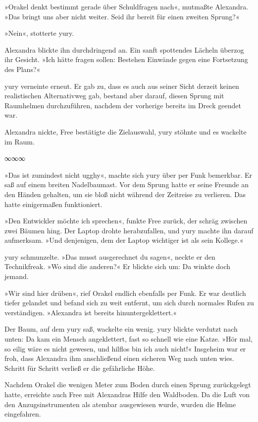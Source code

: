 »Orakel denkt bestimmt gerade über Schuldfragen nach«, mutmaßte Alexandra. »Das bringt uns aber nicht weiter. Seid ihr bereit für einen zweiten Sprung?«

»Nein«, stotterte yury.

Alexandra blickte ihn durchdringend an. Ein sanft spottendes Lächeln überzog ihr Gesicht. »Ich hätte fragen sollen: Bestehen Einwände gegen eine Fortsetzung des Plans?«

yury verneinte erneut. Er gab zu, dass es auch aus seiner Sicht derzeit keinen realistischen Alternativweg gab, bestand aber darauf, diesen Sprung mit Raumhelmen durchzuführen, nachdem der vorherige bereits im Dreck geendet war.

Alexandra nickte, Free bestätigte die Zielauswahl, yury stöhnte und es wackelte im Raum.

\begin{center}
∞∞∞
\end{center}

»Das ist zumindest nicht ugghy«, machte sich yury über per Funk bemerkbar. Er saß auf einem breiten Nadelbaumast. Vor dem Sprung hatte er seine Freunde an den Händen gehalten, um sie bloß nicht während der Zeitreise zu verlieren. Das hatte einigermaßen funktioniert.

»Den Entwickler möchte ich sprechen«, funkte Free zurück, der schräg zwischen zwei Bäumen hing. Der Laptop drohte herabzufallen, und yury machte ihn darauf aufmerksam. »Und denjenigen, dem der Laptop wichtiger ist als sein Kollege.«

yury schmunzelte. »Das musst ausgerechnet du sagen«, neckte er den Technikfreak. »Wo sind die anderen?« Er blickte sich um: Da winkte doch jemand.

»Wir sind hier drüben«, rief Orakel endlich ebenfalls per Funk. Er war deutlich tiefer gelandet und befand sich zu weit entfernt, um sich durch normales Rufen zu verständigen. »Alexandra ist bereits hinuntergeklettert.«

Der Baum, auf dem yury saß, wackelte ein wenig. yury blickte verdutzt nach unten: Da kam ein Mensch angeklettert, fast so schnell wie eine Katze. »Hör mal, so eilig wäre es nicht gewesen, und hilflos bin ich auch nicht!« Insgeheim war er froh, dass Alexandra ihm anschließend einen sicheren Weg nach unten wies. Schritt für Schritt verließ er die gefährliche Höhe.

Nachdem Orakel die wenigen Meter zum Boden durch einen Sprung zurückgelegt hatte, erreichte auch Free mit Alexandras Hilfe den Waldboden. Da die Luft von den Anzugsinstrumenten als atembar ausgewiesen wurde, wurden die Helme eingefahren.

